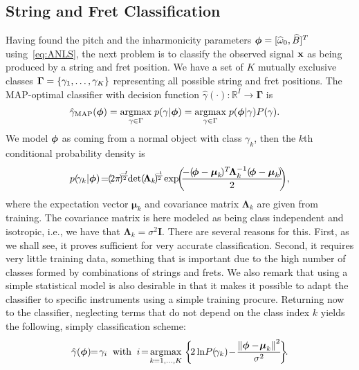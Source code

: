 \documentclass{article}
\begin{document}
\subsection{String and Fret Classification} %
\label{sec:proposed_classification_of_string_and_fret}
Having found the pitch and the inharmonicity parameters $\text{\boldmath$\phi$} = [\widehat\omega_0, \widehat B ]^T$ using~\eqref{eq:ANLS}, the next problem is to classify the observed signal $\mathbf x$ as being produced by a string and fret position. We have a set of $K$ mutually exclusive classes ${\mbox{\boldmath $\Gamma$}}=\{\gamma_1,\dots,\gamma_K\}$ representing all possible string and fret positions. The MAP-optimal classifier with decision function $\hat{\gamma}(\cdot)\!:\! \mathbb{R}^I \!\!\!\rightarrow \!\!\boldsymbol{\Gamma}  $ is~\cite{mspr}
\begin{align}
    \hat\gamma_{\textup{MAP}}(\text{\boldmath$\phi$}) &= \underset{\gamma\in\Gamma}{\operatorname{argmax}}\;{p(\gamma|\text{\boldmath$\phi$})} = \underset{\gamma\in\Gamma}{\operatorname{argmax}}\;{p(\text{\boldmath$\phi$}|\gamma)P(\gamma)}.
\end{align}
We model $\text{\boldmath$\phi$}$ as coming from a normal object with class $\gamma_k$, then the $k$th conditional probability density is   
\begin{equation}
    p(\!\gamma_k\lvert\vecphi)\! = \!\! {{(\!2\pi\!)^{\!\!\frac{\!-\!I}{2}}\!\!\det{\!(\!\boldsymbol{\Lambda}_k\!)\!^{\!\frac{\!-\!1}{2}}\!\!}}}\, \exp\!\!\bigg(\!\!\frac{-(\!\vecphi-\boldsymbol{\mu}_k\!)^T\!\boldsymbol{\Lambda}_k^{-1} (\!\vecphi-\boldsymbol{\mu}_k\!) }{2}\!\! \bigg),
\end{equation}
where the expectation vector $\boldsymbol{\mu}_k$ and covariance matrix $\boldsymbol{\Lambda}_k$ are given from training. The covariance matrix is here modeled as being class independent and isotropic, i.e., we have that $\boldsymbol{\Lambda}_k=\sigma^2\mathbf{I}$. There are several reasons for this. First, as we shall see, it proves sufficient for very accurate classification. Second, it requires very little training data, something that is important due to the high number of classes formed by combinations of strings and frets. We also remark that using a simple statistical model is also desirable in that it makes it possible to adapt the classifier to specific instruments using a simple training procure. Returning now to the classifier, neglecting terms that do not depend on the class index $k$ yields the following, simply classification scheme:
\begin{equation}\label{eq:classifier}
  \hat{\gamma}(\vecphi)\!\!=\!{\gamma}_i \;\; \textup{with} \;\; 
  i\!=\!\argmax{k=1,\dots,K}
  {\bigg\{\!
   2\ln\! P(\!\gamma_k)\! -\! \frac{\norm{\vecphi-\!\boldsymbol{\mu}_k}^2}{\sigma^2}\! \bigg\}}\!.
\end{equation}
\end{document}
